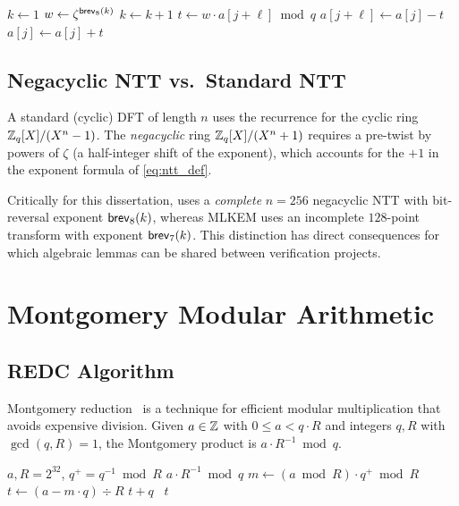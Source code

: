 \begin{algorithm}[htbp]
\caption{Forward NTT (Cooley--Tukey DIT, negacyclic, $n = 256$)}
\label{alg:ntt}
\begin{algorithmic}[1]
\State $k \gets 1$
    \State $w \gets \zeta^{\mathsf{brev}_8(k)}$ 
    \State $k \gets k + 1$
      \State $t \gets w \cdot a[j+\ell] \bmod q$
      \State $a[j+\ell] \gets a[j] - t$
      \State $a[j] \gets a[j] + t$
    \EndFor
  \EndFor
\EndFor
\EndProcedure
\end{algorithmic}
\end{algorithm}

\subsection{Negacyclic NTT vs.\ Standard NTT}

A standard (cyclic) DFT of length $n$ uses the recurrence for the cyclic ring
$\mathbb{Z}_q[X]/(X^n - 1)$.  The \emph{negacyclic} ring $\mathbb{Z}_q[X]/(X^n + 1)$ requires
a pre-twist by powers of $\zeta$ (a half-integer shift of the exponent), which
accounts for the $+1$ in the exponent formula of \cref{eq:ntt_def}.

Critically for this dissertation, \haetae{} uses a \emph{complete} $n=256$
negacyclic NTT with bit-reversal exponent $\mathsf{brev}_8(k)$, whereas MLKEM uses an
incomplete $128$-point transform with exponent $\mathsf{brev}_7(k)$.  This distinction
has direct consequences for which algebraic lemmas can be shared between
verification projects.

\section{Montgomery Modular Arithmetic}

\subsection{REDC Algorithm}

Montgomery reduction~\cite{Montgomery1985} is a technique for efficient modular
multiplication that avoids expensive division.  Given $a \in \mathbb{Z}$ with
$0 \le a < q \cdot R$ and integers $q, R$ with $\gcd(q, R) = 1$, the
Montgomery product is $a \cdot R^{-1} \bmod q$.

\begin{algorithm}[htbp]
\caption{Montgomery Reduction with the \haetae{} Sign Convention}
\label{alg:mont_reduce}
\begin{algorithmic}[1]
\Require $a, R = 2^{32}$, $q^+ = q^{-1} \bmod R$
\Ensure $a \cdot R^{-1} \bmod q$
\State $m \gets (a \bmod R) \cdot q^+ \bmod R$
\State $t \gets (a - m \cdot q) \div R$
 \Return $t + q$ \Else\ \Return $t$ \EndIf
\end{algorithmic}
\end{algorithm}

